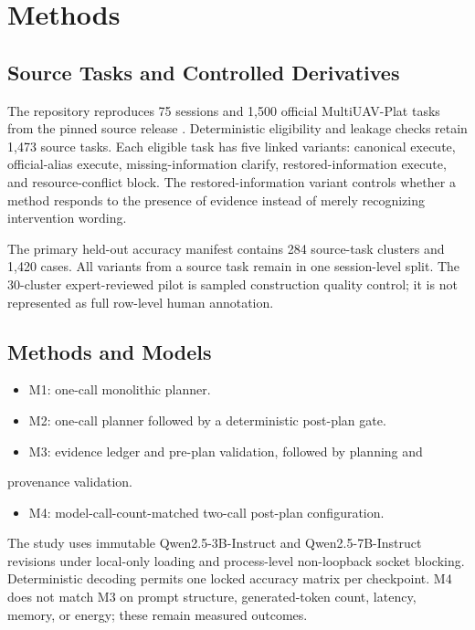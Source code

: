 \documentclass[conference]{IEEEtran}
\begin{document}
\section{Methods}

\subsection{Source Tasks and Controlled Derivatives}

The repository reproduces 75 sessions and 1,500 official MultiUAV-Plat tasks
from the pinned source release \cite{multiuav_plat}. Deterministic eligibility and leakage checks
retain 1,473 source tasks. Each eligible task has five linked variants:
canonical execute, official-alias execute, missing-information clarify,
restored-information execute, and resource-conflict block. The
restored-information variant controls whether a method responds to the
presence of evidence instead of merely recognizing intervention wording.

The primary held-out accuracy manifest contains 284 source-task clusters and
1,420 cases. All variants from a source task remain in one session-level split.
The 30-cluster expert-reviewed pilot is sampled construction quality control;
it is not represented as full row-level human annotation.

\subsection{Methods and Models}

\begin{itemize}
\item M1: one-call monolithic planner.
\item M2: one-call planner followed by a deterministic post-plan gate.
\item M3: evidence ledger and pre-plan validation, followed by planning and
\end{itemize}
provenance validation.
\begin{itemize}
\item M4: model-call-count-matched two-call post-plan configuration.
\end{itemize}

The study uses immutable Qwen2.5-3B-Instruct and Qwen2.5-7B-Instruct revisions
under local-only loading and process-level non-loopback socket blocking.
Deterministic decoding permits one locked accuracy matrix per checkpoint. M4
does not match M3 on prompt structure, generated-token count, latency, memory,
or energy; these remain measured outcomes.
\end{document}
